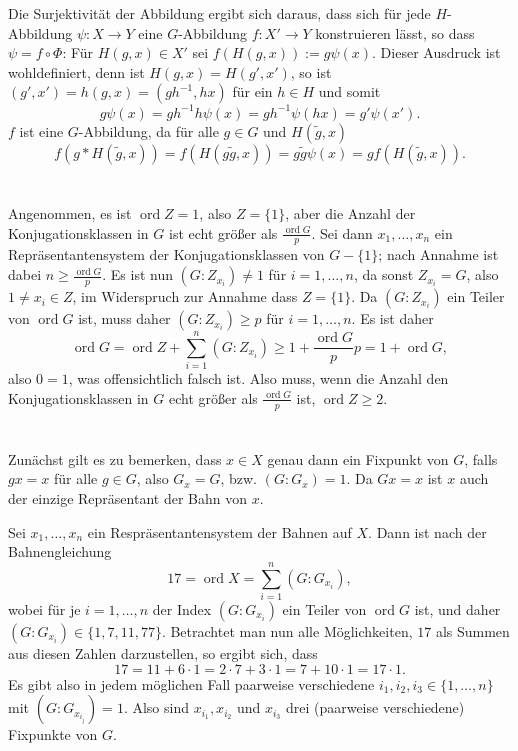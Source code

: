 \documentclass[a4paper,10pt]{article}
\theoremstyle{definition}
\newcommand{\ord}{\operatorname{ord}}
\begin{document}
Die Surjektivität der Abbildung ergibt sich daraus, dass sich für jede $H$-Abbildung $\psi : X \rightarrow Y$ eine $G$-Abbildung $f : X' \rightarrow Y$ konstruieren lässt, so dass $\psi = f \circ \Phi$: Für $H(g,x) \in X'$ sei $f(H(g,x)) :=  g \psi(x)$. Dieser Ausdruck ist wohldefiniert, denn ist $H(g,x) = H(g',x')$, so ist $(g',x') = h(g,x) = (gh^{-1},hx)$ für ein $h \in H$ und somit
\[
 g \psi(x) = g h^{-1} h \psi(x) = g h^{-1} \psi(hx) = g' \psi(x').
\]
$f$ ist eine $G$-Abbildung, da für alle $g \in G$ und $H(\tilde{g},x)$
\[
 f( g * H(\tilde{g},x) )
 = f( H(g\tilde{g}, x) )
 = g \tilde{g} \psi(x)
 = g f( H(\tilde{g},x) ).
\]





\section{}
Angenommen, es ist $\ord Z = 1$, also $Z = \{1\}$, aber die Anzahl der Konjugationsklassen in $G$ ist echt größer als $\frac{\ord G}{p}$. Sei dann $x_1, \ldots, x_n$ ein Repräsentantensystem der Konjugationsklassen von $G-\{1\}$; nach Annahme ist dabei $n \geq \frac{\ord G}{p}$. Es ist nun $(G : Z_{x_i}) \neq 1$ für $i=1,\ldots,n$, da sonst $Z_{x_i} = G$, also $1 \neq x_i \in Z$, im Widerspruch zur Annahme dass $Z = \{1\}$. Da $(G : Z_{x_i})$ ein Teiler von $\ord G$ ist, muss daher $(G : Z_{x_i}) \geq p$ für $i=1,\ldots,n$. Es ist daher
\[
 \ord G = \ord Z + \sum_{i=1}^n (G : Z_{x_i}) \geq 1 + \frac{\ord G}{p} p = 1 + \ord G,
\]
also $0 = 1$, was offensichtlich falsch ist. Also muss, wenn die Anzahl den Konjugationsklassen in $G$ echt größer als $\frac{\ord G}{p}$ ist, $\ord Z \geq 2$.





\section{}
Zunächst gilt es zu bemerken, dass $x \in X$ genau dann ein Fixpunkt von $G$, falls $gx = x$ für alle $g \in G$, also $G_x = G$, bzw. $(G : G_x) = 1$. Da $Gx = x$ ist $x$ auch der einzige Repräsentant der Bahn von $x$.

Sei $x_1, \ldots, x_n$ ein Respräsentantensystem der Bahnen auf $X$. Dann ist nach der Bahnengleichung
\[
 17 = \ord X = \sum_{i=1}^n (G : G_{x_i}),
\]
wobei für je $i=1, \ldots, n$ der Index $(G : G_{x_i})$ ein Teiler von $\ord G$ ist, und daher $(G : G_{x_i}) \in \{1,7,11,77\}$. Betrachtet man nun alle Möglichkeiten, $17$ als Summen aus diesen Zahlen darzustellen, so ergibt sich, dass
\[
 17
 = 11 + 6 \cdot 1
 = 2 \cdot 7 + 3 \cdot 1
 = 7 + 10 \cdot 1
 = 17 \cdot 1.
\]
Es gibt also in jedem möglichen Fall paarweise verschiedene $i_1, i_2, i_3 \in \{1, \ldots, n\}$ mit $(G : G_{x_{i_j}}) = 1$. Also sind $x_{i_1}, x_{i_2}$ und $x_{i_3}$ drei (paarweise verschiedene) Fixpunkte von $G$.
\end{document}
